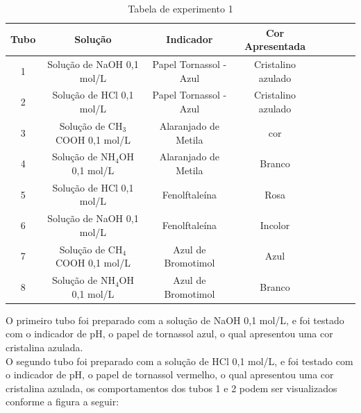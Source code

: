         \begin{table}[h]\label{tab:tubos}
            \label{tab:experimento1}
            \centering
            \begin{tabular}{|c|c|c|c|c|c|c|c|}
                \hline
                \textbf{Tubo} & \textbf{Solução} & \textbf{Indicador} & \textbf{Cor Apresentada}\\
                \hline
                1 & Solução de NaOH 0,1 mol/L & Papel Tornassol - Azul & Cristalino azulado \\
                \hline
                2 & Solução de HCl 0,1 mol/L & Papel Tornassol - Azul & Cristalino azulado \\
                \hline
                3 & Solução de CH$_3$COOH 0,1 mol/L & Alaranjado de Metila & cor\\
                \hline
                4 & Solução de NH$_4$OH 0,1 mol/L & Alaranjado de Metila & Branco \\
                \hline
                5 & Solução de HCl 0,1 mol/L & Fenolftaleína & Rosa \\
                \hline
                6 & Solução de NaOH 0,1 mol/L & Fenolftaleína & Incolor \\
                \hline
                7 & Solução de CH$_4$COOH 0,1 mol/L & Azul de Bromotimol & Azul \\
                \hline
                8 & Solução de NH$_4$OH 0,1 mol/L & Azul de Bromotimol & Branco \\
                \hline
            \end{tabular}
            \caption{Tabela de experimento 1}
        \end{table}

        \indent O primeiro tubo foi preparado com a solução de NaOH 0,1 mol/L, e foi testado com o indicador de pH, o papel de tornassol azul, o qual apresentou uma cor cristalina azulada.\\

        \indent O segundo tubo foi preparado com a solução de HCl 0,1 mol/L, e foi testado com o indicador de pH, o papel de tornassol vermelho, o qual apresentou uma cor cristalina azulada, os comportamentos dos tubos 1 e 2 podem ser visualizados conforme a figura a seguir:\\

